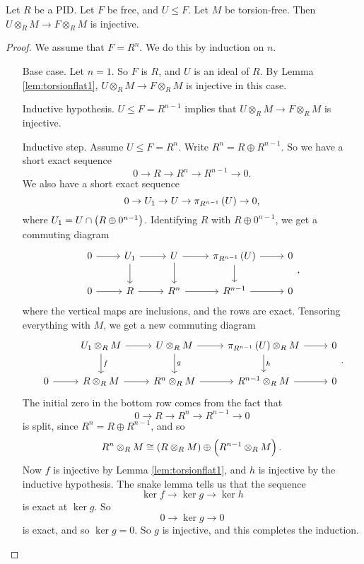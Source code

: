 \begin{lemma}
\label{lem:torsionflat4}
Let $ R $ be a PID. Let $ F $ be free, and $ U \le F $. Let $ M $ be torsion-free. Then $ U \otimes_R M \to F \otimes_R M $ is injective.
\end{lemma}

\begin{proof}
We assume that $ F = R^n $. We do this by induction on $ n $.
\begin{itemize}[leftmargin=1.5in]
\item[Base case.] Let $ n = 1 $. So $ F $ is $ R $, and $ U $ is an ideal of $ R $. By Lemma \ref{lem:torsionflat1}, $ U \otimes_R M \to F \otimes_R M $ is injective in this case.
\item[Inductive hypothesis.] $ U \le F = R^{n - 1} $ implies that $ U \otimes_R M \to F \otimes_R M $ is injective.
\item[Inductive step.] Assume $ U \le F = R^n $. Write $ R^n = R \oplus R^{n - 1} $. So we have a short exact sequence
$$ 0 \to R \to R^n \to R^{n - 1} \to 0. $$
We also have a short exact sequence
$$ 0 \to U_1 \to U \to \pi_{R^{n - 1}}\br{U} \to 0, $$
where $ U_1 = U \cap \br{R \oplus 0^{n - 1}} $. Identifying $ R $ with $ R \oplus 0^{n - 1} $, we get a commuting diagram
$$
\begin{tikzcd}
0 \arrow{r} & U_1 \arrow{r} \arrow{d} & U \arrow{r} \arrow{d} & \pi_{R^{n - 1}}\br{U} \arrow{r} \arrow{d} & 0 \\
0 \arrow{r} & R \arrow{r} & R^n \arrow{r} & R^{n - 1} \arrow{r} & 0
\end{tikzcd},
$$
where the vertical maps are inclusions, and the rows are exact. Tensoring everything with $ M $, we get a new commuting diagram
$$
\begin{tikzcd}
& U_1 \otimes_R M \arrow{r} \arrow{d}{f} & U \otimes_R M \arrow{r} \arrow{d}{g} & \pi_{R^{n - 1}}\br{U} \otimes_R M \arrow{r} \arrow{d}{h} & 0 \\
0 \arrow{r} & R \otimes_R M \arrow{r} & R^n \otimes_R M \arrow{r} & R^{n - 1} \otimes_R M \arrow{r} & 0
\end{tikzcd}.
$$
The initial zero in the bottom row comes from the fact that
$$ 0 \to R \to R^n \to R^{n - 1} \to 0 $$
is split, since $ R^n = R \oplus R^{n - 1} $, and so
$$ R^n \otimes_R M \cong \br{R \otimes_R M} \oplus \br{R^{n - 1} \otimes_R M}. $$
Now $ f $ is injective by Lemma \ref{lem:torsionflat1}, and $ h $ is injective by the inductive hypothesis. The snake lemma tells us that the sequence
$$ \ker f \to \ker g \to \ker h $$
is exact at $ \ker g $. So
$$ 0 \to \ker g \to 0 $$
is exact, and so $ \ker g = 0 $. So $ g $ is injective, and this completes the induction.
\end{itemize}
\end{proof}

